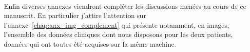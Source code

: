 \documentclass[main.tex]{subfiles}
\begin{document}
\paragraph{}
Enfin diverses annexes viendront compléter les discussions menées au cours de ce manuscrit. En particulier j'attire l'attention sur l'annexe~\ref{chap:anx_img_complement} qui présente notamment, en images, l'ensemble des données cliniques dont nous disposons pour les deux patients, données qui ont toutes été acquises sur la même machine. 
\end{document}
